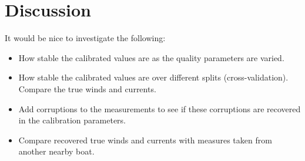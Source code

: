 \documentclass{article}
\begin{document}
\section{Discussion}
It would be nice to investigate the following:
\begin{itemize}
\item How stable the calibrated values are as the quality parameters are varied.
\item How stable the calibrated values are over different splits (cross-validation). Compare the true winds and currents.
\item Add corruptions to the measurements to see if these corruptions are recovered in the calibration parameters.
\item Compare recovered true winds and currents with measures taken from another nearby boat.
\end{itemize}
\end{document}
